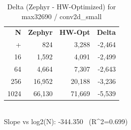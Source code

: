 \begin{table}[tb]
    \centering
    \caption{Delta (Zephyr - HW-Optimized) for max32690 / conv2d_small}
    \label{tab:delta_max32690_conv2d_small}
    \scriptsize
    \begin{tabular}{r r r r}
        \hline
        \textbf{N} & \textbf{Zephyr} & \textbf{HW-Opt} & \textbf{Delta} \\\n+        \hline
        4 & 824 & 3,288 & -2,464\\
        16 & 1,592 & 4,091 & -2,499\\
        64 & 4,664 & 7,307 & -2,643\\
        256 & 16,952 & 20,188 & -3,236\\
        1024 & 66,130 & 71,669 & -5,539\\
        \hline
    \end{tabular}
    \vspace{2mm}\\\n    Slope vs log2(N): -344.350 \ (R^2=0.699)\n\end{table}
